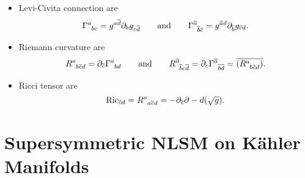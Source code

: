 \begin{itemize}
  \item Levi-Civita connection are
    \begin{equation}
      \Gamma\indices{^{a}_{bc}} = g^{a \overline{d}{}} \partial_b g_{c \overline{d}{}} \qquad \text{and} \qquad \Gamma\indices{^{\overline{a}{}}_{\overline{b}{} \overline{c}{}}} = g^{\overline{a}{} d} \partial_{\overline{b}{}} g_{\overline{c}{} d}.
    \end{equation}
  \item Riemann curvature are
    \begin{equation}
      R\indices{^{a}_{b \overline{ c}{} d}} = \partial_{\overline{c}{}} \Gamma\indices{^{a}_{bd}} \qquad \text{and} \qquad R\indices{^{\overline{a}{}}_{\overline{b}{} c \overline{d}{}}} = \partial_c \Gamma \indices{^{\overline{a}{}}_{\overline{b}{} \overline{d}{}}} = \overline{(R\indices{^{a}_{b \overline{c}{} d}})}{}.
    \end{equation}
  \item Ricci tensor are
    \begin{equation}
      \text{Ric}_{\overline{c}{} d} = R\indices{^{a}_{a \overline{c}{} d}} = - \partial_{\overline{c}{}} \partial-d (\sqrt{g}).
    \end{equation}
\end{itemize}

\section{Supersymmetric NLSM on Kähler Manifolds}%
\label{sec:susy_for_kahler_manifolds}

